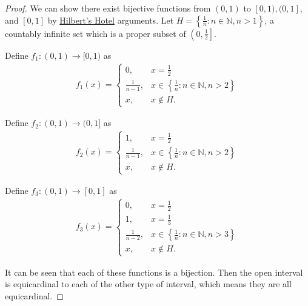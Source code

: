 \documentclass{article}[12pt]
\newcommand{\N}{\mathbb{N}}
\begin{document}
        \begin{proof}
            We can show there exist bijective functions from $(0, 1)$ to $[0, 1), (0, 1],$ and $[0, 1]$ by \href{https://youtu.be/Uj3_KqkI9Zo}{Hilbert's Hotel} arguments. Let $H = \left\{\frac{1}{n} : n \in \N, n > 1 \right\}$, a countably infinite set which is a proper subset of $\left(0, \frac{1}{2}\right]$.
            
            Define $f_1 : (0, 1) \to [0, 1)$ as
            \begin{align}
                f_1(x) = \begin{cases}
                    0,              & x = \frac{1}{2}
                    \\
                    \frac{1}{n-1},  & x \in \left\{\frac{1}{n} : n \in \N, n > 2\right\}
                    \\
                    x,              & x \not\in H.
                \end{cases}
            \end{align}
            
            Define $f_2 : (0, 1) \to (0, 1]$ as
            \begin{align}
                f_2(x) = \begin{cases}
                    1,              & x = \frac{1}{2}
                    \\
                    \frac{1}{n-1},  & x \in \left\{\frac{1}{n} : n \in \N, n > 2\right\}
                    \\
                    x,              & x \not\in H.
                \end{cases}
            \end{align}
            
            Define $f_3 : (0, 1) \to [0, 1]$ as
            \begin{align}
                f_3(x) = \begin{cases}
                    0,              & x = \frac{1}{2}
                    \\
                    1,              & x = \frac{1}{3}
                    \\
                    \frac{1}{n-2},  & x \in \left\{\frac{1}{n} : n \in \N, n > 3\right\}
                    \\
                    x,              & x \not\in H.
                \end{cases}
            \end{align}
            
        It can be seen that each of these functions is a bijection. Then the open interval is equicardinal to each of the other type of interval, which means they are all equicardinal.
    \end{proof}
\end{document}
